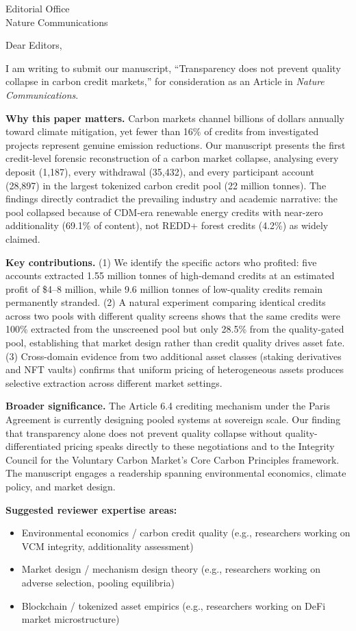 \documentclass[11pt]{letter}
\begin{document}
\begin{letter}{Editorial Office\\Nature Communications}

\opening{Dear Editors,}

I am writing to submit our manuscript, ``Transparency does not prevent quality collapse in carbon credit markets,'' for consideration as an Article in \textit{Nature Communications}.

\textbf{Why this paper matters.} Carbon markets channel billions of dollars annually toward climate mitigation, yet fewer than 16\% of credits from investigated projects represent genuine emission reductions. Our manuscript presents the first credit-level forensic reconstruction of a carbon market collapse, analysing every deposit (1,187), every withdrawal (35,432), and every participant account (28,897) in the largest tokenized carbon credit pool (22 million tonnes). The findings directly contradict the prevailing industry and academic narrative: the pool collapsed because of CDM-era renewable energy credits with near-zero additionality (69.1\% of content), not REDD+ forest credits (4.2\%) as widely claimed.

\textbf{Key contributions.} (1) We identify the specific actors who profited: five accounts extracted 1.55 million tonnes of high-demand credits at an estimated profit of \$4--8 million, while 9.6 million tonnes of low-quality credits remain permanently stranded. (2) A natural experiment comparing identical credits across two pools with different quality screens shows that the same credits were 100\% extracted from the unscreened pool but only 28.5\% from the quality-gated pool, establishing that market design rather than credit quality drives asset fate. (3) Cross-domain evidence from two additional asset classes (staking derivatives and NFT vaults) confirms that uniform pricing of heterogeneous assets produces selective extraction across different market settings.

\textbf{Broader significance.} The Article 6.4 crediting mechanism under the Paris Agreement is currently designing pooled systems at sovereign scale. Our finding that transparency alone does not prevent quality collapse without quality-differentiated pricing speaks directly to these negotiations and to the Integrity Council for the Voluntary Carbon Market's Core Carbon Principles framework. The manuscript engages a readership spanning environmental economics, climate policy, and market design.

\textbf{Suggested reviewer expertise areas:}
\begin{itemize}
\item Environmental economics / carbon credit quality (e.g., researchers working on VCM integrity, additionality assessment)
\item Market design / mechanism design theory (e.g., researchers working on adverse selection, pooling equilibria)
\item Blockchain / tokenized asset empirics (e.g., researchers working on DeFi market microstructure)
\end{itemize}


\end{letter}
\end{document}
